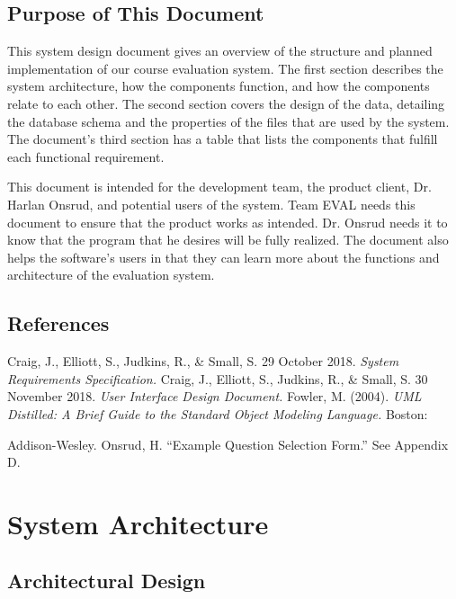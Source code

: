 \documentclass{article}
\begin{document}
\subsection{Purpose of This Document}

This system design document gives an overview of the structure and planned implementation of our course evaluation system. The first section describes the system architecture, how the components function, and how the components relate to each other. The second section covers the design of the data, detailing the database schema and the properties of the files that are used by the system. The document's third section has a table that lists the components that fulfill each functional requirement.

This document is intended for the development team, the product client, Dr. Harlan Onsrud, and potential users of the system. Team EVAL needs this document to ensure that the product works as intended. Dr. Onsrud needs it to know that the program that he desires will be fully realized. The document also helps the software's users in that they can learn more about the functions and architecture of the evaluation system.

\subsection{References}

Craig, J., Elliott, S., Judkins, R., \& Small, S. 29 October 2018. \textit{System Requirements Specification.}
\vspace{3mm}\newline
Craig, J., Elliott, S., Judkins, R., \& Small, S. 30 November 2018. \textit{User Interface Design Document.}
\vspace{3mm}\newline
Fowler, M. (2004). \textit{UML Distilled: A Brief Guide to the Standard Object Modeling Language.} Boston:

Addison-Wesley.
\vspace{3mm}\newline
Onsrud, H. ``Example Question Selection Form.'' See Appendix D.

\section{System Architecture}
\subsection{Architectural Design}
\end{document}
